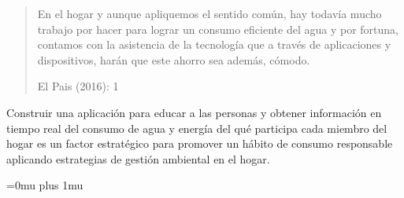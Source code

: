 \documentclass[a4paper,man,natbib]{apa6}
\begin{document}
\begin{quote}
    \vspace{5pt}
    {\small
    En el hogar y aunque apliquemos el sentido común, hay todavía mucho trabajo por hacer para lograr un consumo eficiente del agua y por fortuna, contamos con la asistencia de la tecnología que a través de aplicaciones y dispositivos, harán que este ahorro sea además, cómodo.
    }
    \begin{flushright}
        El Pais (2016): 1
    \end{flushright}

\end{quote}

Construir una aplicación para educar a las personas y obtener información en tiempo real del consumo de agua y energía del qué participa cada miembro del hogar es un factor estratégico para promover un hábito de consumo responsable aplicando estrategias de gestión ambiental en el hogar.

\nocite{*}

\Urlmuskip=0mu plus 1mu\relax


\end{document}
